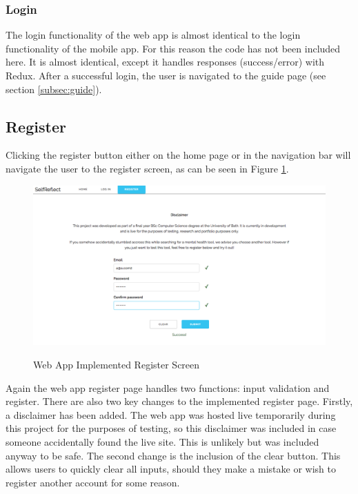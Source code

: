 \documentclass[11pt,openright,a4paper]{report}
\begin{document}
\subsubsection{Login}
The login functionality of the web app is almost identical to the login functionality of the mobile app. For this reason the code has not been included here. It is almost identical, except it handles responses (success/error) with Redux. After a successful login, the user is navigated to the guide page (see section \ref{subsec:guide}).

\subsection{Register}
Clicking the register button either on the home page or in the navigation bar will navigate the user to the register screen, as can be seen in Figure \ref{fig:webregisterimpl}.

\begin{figure}[ht]
\centering
\caption{Web App Implemented Register Screen}
\includegraphics[width=\textwidth]{i/webregisterimpl.png}
\label{fig:webregisterimpl}
\end{figure}

Again the web app register page handles two functions: input validation and register. There are also two key changes to the implemented register page. Firstly, a disclaimer has been added. The web app was hosted live temporarily during this project for the purposes of testing, so this disclaimer was included in case someone accidentally found the live site. This is unlikely but was included anyway to be safe. The second change is the inclusion of the clear button. This allows users to quickly clear all inputs, should they make a mistake or wish to register another account for some reason.

\newpage
\end{document}
